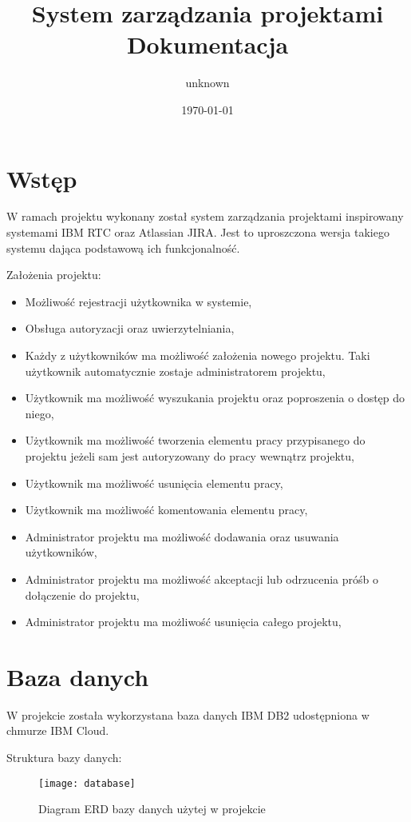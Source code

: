 \documentclass[11pt, titlepage]{article}
\title{System zarządzania projektami\\Dokumentacja}
\author{unknown}
\date{\today}
\begin{document}
\maketitle

\section{Wstęp}
\hspace{11pt} W ramach projektu wykonany został system zarządzania projektami inspirowany systemami IBM RTC oraz Atlassian JIRA. Jest to uproszczona wersja takiego systemu dająca podstawową ich funkcjonalność.

Założenia projektu:
\begin{itemize}
\item Możliwość rejestracji użytkownika w systemie,
\item Obsługa autoryzacji oraz uwierzytelniania,
\item Każdy z użytkowników ma możliwość założenia nowego projektu. Taki użytkownik automatycznie zostaje administratorem projektu,
\item Użytkownik ma możliwość wyszukania projektu oraz poproszenia o dostęp do niego,
\item Użytkownik ma możliwość tworzenia elementu pracy przypisanego do projektu jeżeli sam jest autoryzowany do pracy wewnątrz projektu,
\item Użytkownik ma możliwość usunięcia elementu pracy,
\item Użytkownik ma możliwość komentowania elementu pracy,
\item Administrator projektu ma możliwość dodawania oraz usuwania użytkowników,
\item Administrator projektu ma możliwość akceptacji lub odrzucenia próśb o dołączenie do projektu,
\item Administrator projektu ma możliwość usunięcia całego projektu,
\end{itemize}

\break

\section{Baza danych}
\hspace{11pt} W projekcie została wykorzystana baza danych IBM DB2 udostępniona w chmurze IBM Cloud.

Struktura bazy danych:
\begin{figure}[H]
\caption{Diagram ERD bazy danych użytej w projekcie}
\texttt{[image: database]}
\end{figure}
\end{document}
